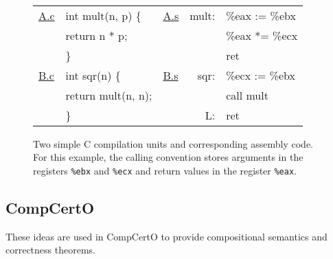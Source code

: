 \begin{figure} %
  \figsize
  \centering
  \tt
  {\footnotesize
  \begin{tabular}{ll lr@{\ }l}
    \hline
    \underline{A.c} & int mult(n, p) \{ &
    \underline{A.s} & mult: & \%eax := \%ebx \\
                    & \quad return n * p; &
                    & & \%eax *= \%ecx \\
                    & \} &
                    & & ret \\
    \hline
    \underline{B.c} & int sqr(n) \{ &
    \underline{B.s} & sqr: & \%ecx := \%ebx \\
                    & \quad return mult(n, n); &
                    & & call mult \\
                    & \} &
                    & L: & ret \\
    \hline
  \end{tabular}
  }
  \caption{Two simple C compilation units and corresponding assembly code.
    For this example,
    the calling convention stores arguments in
    the registers
    \texttt{\%ebx} and \texttt{\%ecx}
    and return values in
    the register
    \texttt{\%eax}.}
  \label{fig:abc}
\end{figure}



\subsection{CompCertO} \label{sec:mainideas:compcerto} %


These ideas are used in CompCertO
to provide compositional semantics and
correctness theorems.

